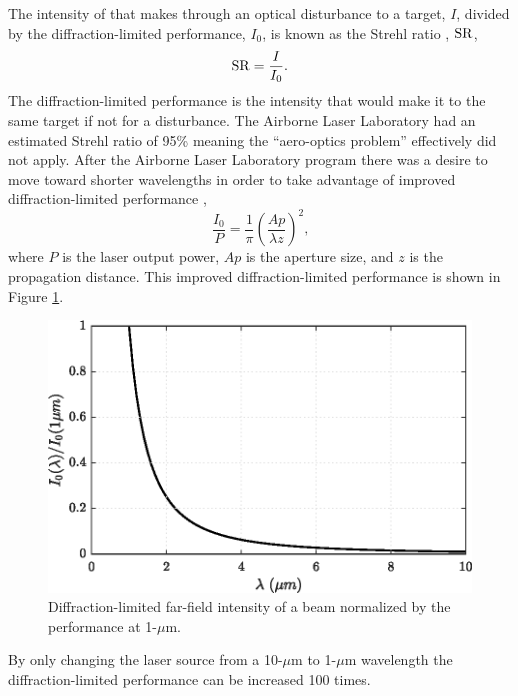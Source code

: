 The intensity of that makes through an optical disturbance to a target, $I$, divided by the diffraction-limited performance, $I_0$, is known as the Strehl ratio \cite{Mahajan-1982-kkXM4eaB}, $\operatorname{SR}$,
\begin{equation}
  \operatorname{SR} = \frac{I}{I_0} \textrm{.}
  \label{eqn:01_strehl_ratio_definition}
\end{equation}
The diffraction-limited performance is the intensity that would make it to the same target if not for a disturbance.
The Airborne Laser Laboratory had an estimated Strehl ratio of 95\%\cite{Jumper-2013-8KtN3pue} meaning the ``aero-optics problem'' effectively did not apply.
After the Airborne Laser Laboratory program there was a desire to move toward shorter wavelengths in order to take advantage of improved diffraction-limited performance \cite{Jumper-2001-6QDh7zDy},
\begin{equation}
  \frac{I_0}{P} = \frac{1}{\pi}\left(\frac{Ap}{\lambda z}\right)^2 \textrm{,}
  \label{eqn:01_farfield_intensity}
\end{equation}
where $P$ is the laser output power, $Ap$ is the aperture size, and $z$ is the propagation distance.
This improved diffraction-limited performance is shown in Figure \ref{fig:01_farfield_intensity}.
\begin{figure}
  \centering
  \includegraphics{../matlab/01_introduction/farfield_intensity.eps}
  \caption{Diffraction-limited far-field intensity of a beam normalized by the performance at 1-$\mu$m.}
  \label{fig:01_farfield_intensity}
\end{figure}
By only changing the laser source from a 10-$\mu$m to 1-$\mu$m wavelength the diffraction-limited performance can be increased 100 times.


